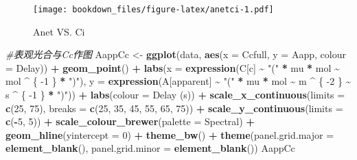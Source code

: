 \documentclass[
]{krantz}
\makeatletter
\newenvironment{Shaded}{\begin{snugshade}}{\end{snugshade}}
\newcommand{\CommentTok}[1]{\textcolor[rgb]{0.56,0.35,0.01}{\textit{#1}}}
\newcommand{\DataTypeTok}[1]{\textcolor[rgb]{0.13,0.29,0.53}{#1}}
\newcommand{\DecValTok}[1]{\textcolor[rgb]{0.00,0.00,0.81}{#1}}
\newcommand{\KeywordTok}[1]{\textcolor[rgb]{0.13,0.29,0.53}{\textbf{#1}}}
\newcommand{\NormalTok}[1]{#1}
\newcommand{\OperatorTok}[1]{\textcolor[rgb]{0.81,0.36,0.00}{\textbf{#1}}}
\newcommand{\StringTok}[1]{\textcolor[rgb]{0.31,0.60,0.02}{#1}}
\newenvironment{kframe}{%
\medskip{}
\setlength{\fboxsep}{.8em}
 \def\at@end@of@kframe{}%
 \ifinner\ifhmode%
  \def\at@end@of@kframe{\end{minipage}}%
  \begin{minipage}{\columnwidth}%
 \fi\fi%
 \def\FrameCommand##1{\hskip\@totalleftmargin \hskip-\fboxsep
 \colorbox{shadecolor}{##1}\hskip-\fboxsep
     \hskip-\linewidth \hskip-\@totalleftmargin \hskip\columnwidth}%
 \MakeFramed {\advance\hsize-\width
   \@totalleftmargin\z@ \linewidth\hsize
   \@setminipage}}%
 {\par\unskip\endMakeFramed%
 \at@end@of@kframe}
\renewenvironment{Shaded}{\begin{kframe}}{\end{kframe}}
\makeatother
\begin{document}
\begin{figure}
\centering
\texttt{[image: bookdown\_files/figure-latex/anetci-1.pdf]}
\caption{\label{fig:anetci}Anet VS. Ci}
\end{figure}

\begin{Shaded}
\begin{Highlighting}[]
\CommentTok{\#表观光合与Cc作图}
\NormalTok{AappCc \textless{}{-}}\StringTok{ }\KeywordTok{ggplot}\NormalTok{(data, }\KeywordTok{aes}\NormalTok{(}\DataTypeTok{x =}\NormalTok{ Ccfull, }\DataTypeTok{y =}\NormalTok{ Aapp, }\DataTypeTok{colour =}\NormalTok{ Delay)) }\OperatorTok{+}
\StringTok{  }\KeywordTok{geom\_point}\NormalTok{() }\OperatorTok{+}
\StringTok{  }\KeywordTok{labs}\NormalTok{(}\DataTypeTok{x =} \KeywordTok{expression}\NormalTok{(C[c] }\OperatorTok{\textasciitilde{}}\StringTok{ "("} \OperatorTok{*}\StringTok{ }\NormalTok{mu }\OperatorTok{*}\StringTok{ }\NormalTok{mol }\OperatorTok{\textasciitilde{}}\StringTok{ }\NormalTok{mol }\OperatorTok{\^{}}\StringTok{ }\NormalTok{\{}
    \DecValTok{{-}1}
\NormalTok{  \} }\OperatorTok{*}\StringTok{ ")"}\NormalTok{),}
  \DataTypeTok{y =} \KeywordTok{expression}\NormalTok{(A[apparent] }\OperatorTok{\textasciitilde{}}\StringTok{ "("} \OperatorTok{*}\StringTok{ }\NormalTok{mu }\OperatorTok{*}\StringTok{ }\NormalTok{mol }\OperatorTok{\textasciitilde{}}\StringTok{ }\NormalTok{m }\OperatorTok{\^{}}\StringTok{ }\NormalTok{\{}
    \DecValTok{{-}2}
\NormalTok{  \} }\OperatorTok{\textasciitilde{}}\StringTok{ }\NormalTok{s }\OperatorTok{\^{}}\StringTok{ }\NormalTok{\{}
    \DecValTok{{-}1}
\NormalTok{  \} }\OperatorTok{*}\StringTok{ ")"}\NormalTok{)) }\OperatorTok{+}
\StringTok{  }\KeywordTok{labs}\NormalTok{(}\DataTypeTok{colour =} \StringTok{\textquotesingle{}Delay (s)\textquotesingle{}}\NormalTok{) }\OperatorTok{+}
\StringTok{  }\KeywordTok{scale\_x\_continuous}\NormalTok{(}\DataTypeTok{limits =} \KeywordTok{c}\NormalTok{(}\DecValTok{25}\NormalTok{, }\DecValTok{75}\NormalTok{),}
                     \DataTypeTok{breaks =} \KeywordTok{c}\NormalTok{(}\DecValTok{25}\NormalTok{, }\DecValTok{35}\NormalTok{, }\DecValTok{45}\NormalTok{, }\DecValTok{55}\NormalTok{, }\DecValTok{65}\NormalTok{, }\DecValTok{75}\NormalTok{)) }\OperatorTok{+}
\StringTok{  }\KeywordTok{scale\_y\_continuous}\NormalTok{(}\DataTypeTok{limits =} \KeywordTok{c}\NormalTok{(}\OperatorTok{{-}}\DecValTok{5}\NormalTok{, }\DecValTok{5}\NormalTok{)) }\OperatorTok{+}
\StringTok{  }\KeywordTok{scale\_colour\_brewer}\NormalTok{(}\DataTypeTok{palette =} \StringTok{\textquotesingle{}Spectral\textquotesingle{}}\NormalTok{) }\OperatorTok{+}
\StringTok{  }\KeywordTok{geom\_hline}\NormalTok{(}\DataTypeTok{yintercept =} \DecValTok{0}\NormalTok{) }\OperatorTok{+}
\StringTok{  }\KeywordTok{theme\_bw}\NormalTok{() }\OperatorTok{+}
\StringTok{  }\KeywordTok{theme}\NormalTok{(}\DataTypeTok{panel.grid.major =} \KeywordTok{element\_blank}\NormalTok{(),}
        \DataTypeTok{panel.grid.minor =} \KeywordTok{element\_blank}\NormalTok{())}
\NormalTok{AappCc}
\end{Highlighting}
\end{Shaded}
\end{document}
